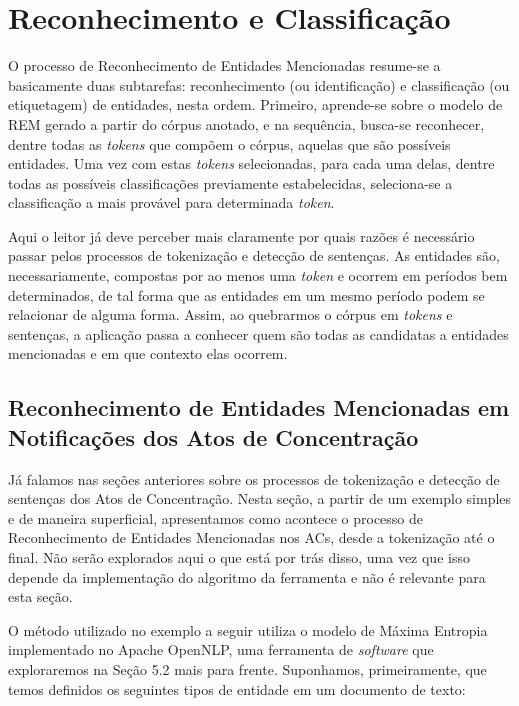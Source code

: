 \documentclass[11pt]{report}
\begin{document}
\section{Reconhecimento e Classificação}

\indent\indent O processo de Reconhecimento de Entidades Mencionadas resume-se a basicamente duas subtarefas: reconhecimento (ou identificação) e classificação (ou etiquetagem)
de entidades, nesta ordem. Primeiro, aprende-se sobre o modelo de REM gerado a partir do córpus anotado, e na sequência, busca-se reconhecer, dentre todas as \textit{tokens}
que compõem o córpus, aquelas que são possíveis entidades. Uma vez com estas \textit{tokens} selecionadas, para cada uma delas, dentre todas as possíveis classificações
previamente estabelecidas, seleciona-se a classificação a mais provável para determinada \textit{token}.

Aqui o leitor já deve perceber mais claramente por quais razões é necessário passar pelos processos de tokenização e detecção de sentenças. As entidades são, necessariamente,
compostas por ao menos uma \textit{token} e ocorrem em períodos bem determinados, de tal forma que as entidades em um mesmo período podem se relacionar de alguma forma. Assim,
ao quebrarmos o córpus em \textit{tokens} e sentenças, a aplicação passa a conhecer quem são todas as candidatas a entidades mencionadas e em que contexto elas ocorrem.

\subsection{Reconhecimento de Entidades Mencionadas em Notificações dos Atos de Concentração}

\indent\indent Já falamos nas seções anteriores sobre os processos de tokenização e detecção de sentenças dos Atos de Concentração. Nesta seção, a partir de um exemplo simples e
de maneira superficial, apresentamos como acontece o processo de Reconhecimento de Entidades Mencionadas nos ACs, desde a tokenização até o final. Não serão explorados aqui
o que está por trás disso, uma vez que isso depende da implementação do algoritmo da ferramenta e não é relevante para esta seção.

O método utilizado no exemplo a seguir utiliza o modelo de Máxima Entropia implementado no Apache OpenNLP, uma ferramenta de \textit{software} que exploraremos na Seção 5.2 mais para frente.
Suponhamos, primeiramente, que temos definidos os seguintes tipos de entidade em um documento de texto:
\end{document}
